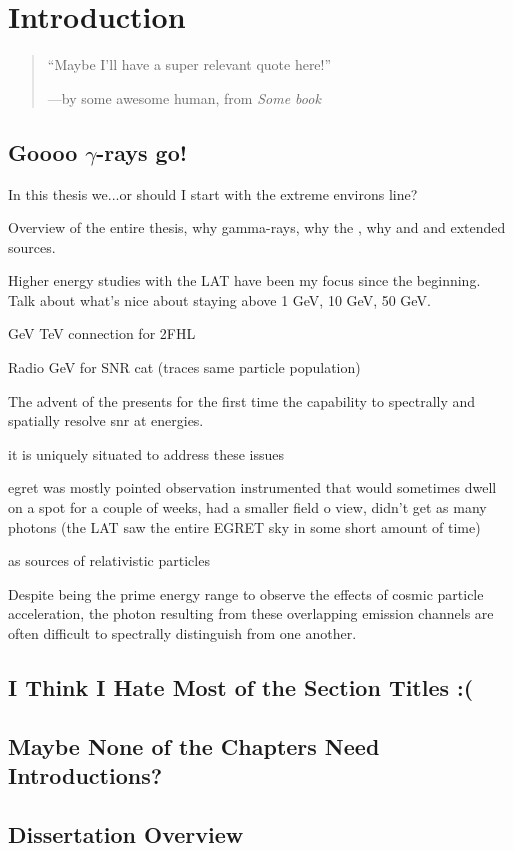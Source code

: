 \chapter{Introduction}
\label{chap:intro}

\begin{quote}
	``Maybe I'll have a super relevant quote here!'' 
	\begin{center}---by some awesome human, from \it{Some book} \end{center}
\end{quote}

\section{Goooo $\gamma$-rays go!}

In this thesis we...or should I start with the extreme environs line?

Overview of the entire thesis, why gamma-rays, why the \lat, why \snr and \pwn and extended sources.

Higher energy studies with the LAT have been my focus since the beginning. Talk about what's nice about staying above 1 GeV, 10 GeV, 50 GeV. 

GeV TeV connection for 2FHL

Radio GeV for SNR cat (traces same particle population)

The advent of the \lat presents for the first time the capability to spectrally and spatially resolve \gls{snr} at \gev energies.

it is uniquely situated to address these issues

egret was mostly pointed observation instrumented that would sometimes dwell on a spot for a couple of weeks, had a smaller field o view, didn't get as many photons (the LAT saw the entire EGRET sky in some short amount of time)

\snrs as sources of relativistic particles

Despite being the prime energy range to observe the effects of cosmic particle acceleration, the photon \sed{} resulting from these overlapping emission channels are often difficult to spectrally distinguish from one another. 
\section{I Think I Hate Most of the Section Titles :(}

\section{Maybe None of the Chapters Need Introductions?}

\section{Dissertation Overview}


